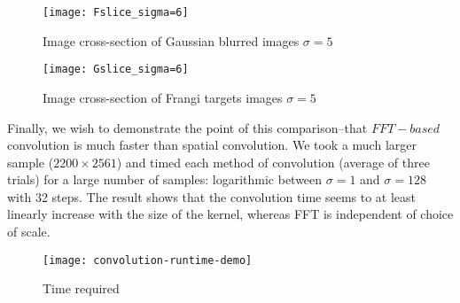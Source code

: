 \begin{figure}
  \centering
  \texttt{[image: Fslice\_sigma=6]}
  \caption{Image cross-section of Gaussian blurred images $\sigma=5$}
  \label{fig:cross-sec-G-sigma=5}
\end{figure}

\begin{figure}
  \centering
  \texttt{[image: Gslice\_sigma=6]}
  \caption{Image cross-section of Frangi targets images $\sigma=5$}
  \label{fig:cross-sec-F-sigma=5}
\end{figure}


Finally, we wish to demonstrate the point of this comparison--that $FFT-based$ convolution is much faster than spatial convolution. We took a much larger sample ($2200 \times 2561$) and timed each method of convolution (average of three trials) for a large number of samples: logarithmic between $\sigma=1$ and $\sigma=128$ with 32 steps. The result shows that the convolution time seems to at least linearly increase with the size of the kernel, whereas FFT is independent of choice of scale.

\begin{figure}
  \texttt{[image: convolution-runtime-demo]}
  \caption{Time required}
\end{figure}



